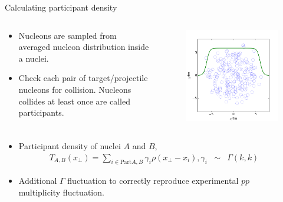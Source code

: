\documentclass[11pt]{beamer}
\begin{document}
\begin{frame}{Calculating participant density}
\begin{columns}
\begin{column}{0.7\textwidth}
\begin{itemize}
\item Nucleons are sampled from averaged nucleon distribution inside a nuclei.
\item Check each pair of target/projectile nucleons for collision.
Nucleons collides at least once are called participants.
\end{itemize}
\end{column}
\begin{column}{0.3\textwidth}
\begin{figure}
\begin{center}
\includegraphics[width = \textwidth]{./pics/WS2.png}
\end{center}
\end{figure}
\end{column}
\end{columns}

\begin{columns}
\begin{column}{\textwidth}
\begin{itemize}
\item Participant density of nuclei $A$ and $B$,
\begin{eqnarray}
	T_{A,B}(x_\perp) = \sum_{i \in \textrm{Part} A,B} \gamma_i \rho(x_\perp- x_i), \gamma_i &\sim& \Gamma(k, k)
\end{eqnarray}
\item Additional $\Gamma$ fluctuation to correctly reproduce experimental $pp$ multiplicity fluctuation.
\end{itemize}
\end{column}
\begin{column}{0.0\textwidth}
\end{column}
\end{columns}
\end{frame}
\end{document}
